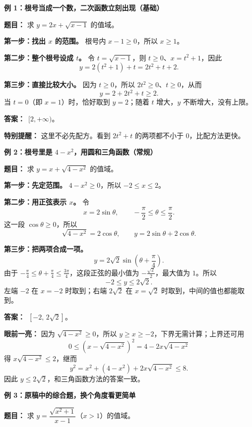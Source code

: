 \clearpage
\begin{examplebox}
  \textbf{\textcolor{CExample}{例 1：根号当成一个数，二次函数立刻出现（基础）}}

  \textbf{题目：} 求 $y=2x+\sqrt{x-1}$ 的值域。

  \textbf{第一步：找出 $x$ 的范围。} 根号内 $x-1\ge0$，所以 $x\ge1$。

  \textbf{第二步：整个根号设成 $t$。} 令 $t=\sqrt{x-1}$，则 $t\ge0$、$x=t^2+1$，因此
  \[
    y=2(t^2+1)+t=2t^2+t+2.
  \]

  \textbf{第三步：直接比较大小。} 因为 $t\ge0$，所以 $2t^2\ge0$、$t\ge0$，从而
  \[
    y=2+2t^2+t\ge2.
  \]
  当 $t=0$（即 $x=1$）时，恰好取到 $y=2$；随着 $t$ 增大，$y$ 不断增大，没有上限。

  \textbf{答案：}\ $\boxed{[2,+\infty)}$。

  \textbf{特别提醒：} 这里不必先配方。看到 $2t^2+t$ 的两项都不小于 $0$，比配方法更快。

  \medskip
  \textbf{\textcolor{CExample}{例 2：根号里是 $4-x^2$，用圆和三角函数（常规）}}

  \textbf{题目：} 求 $y=x+\sqrt{4-x^2}$ 的值域。

  \textbf{第一步：先定范围。} $4-x^2\ge0$，所以 $-2\le x\le2$。

  \textbf{第二步：用正弦表示 $x$。} 令
  \[
    x=2\sin\theta,\qquad
    -\frac{\pi}{2}\le\theta\le\frac{\pi}{2}.
  \]
  这一段 $\cos\theta\ge0$，所以
  \[
    \sqrt{4-x^2}=2\cos\theta,
    \qquad y=2\sin\theta+2\cos\theta.
  \]

  \textbf{第三步：把两项合成一项。}
  \[
    y=2\sqrt2\sin\left(\theta+\frac{\pi}{4}\right).
  \]
  由于 $-\frac\pi4\le\theta+\frac\pi4\le\frac{3\pi}{4}$，这段正弦的最小值为 $-\frac{\sqrt2}{2}$，最大值为 $1$。所以
  \[
    -2\le y\le2\sqrt2.
  \]
  左端 $-2$ 在 $x=-2$ 时取到；右端 $2\sqrt2$ 在 $x=\sqrt2$ 时取到，中间的值也都能取到。

  \textbf{答案：}\ $\boxed{[-2,\,2\sqrt2]}$。

  \textbf{眼前一亮：} 因为 $\sqrt{4-x^2}\ge0$，所以 $y\ge x\ge-2$，下界无需计算；上界还可用
  \[
    0\le\left(x-\sqrt{4-x^2}\right)^2
      =4-2x\sqrt{4-x^2}
  \]
  得 $x\sqrt{4-x^2}\le2$，继而
  \[
    y^2=x^2+(4-x^2)+2x\sqrt{4-x^2}\le8.
  \]
  因此 $y\le2\sqrt2$，和三角函数方法的答案一致。

  \medskip
  \textbf{\textcolor{CExample}{例 3：原稿中的综合题，换个角度看更简单}}

  \textbf{题目：} 求 $y=\dfrac{\sqrt{x^2+1}}{x-1}$（$x>1$）的值域。


\end{examplebox}
